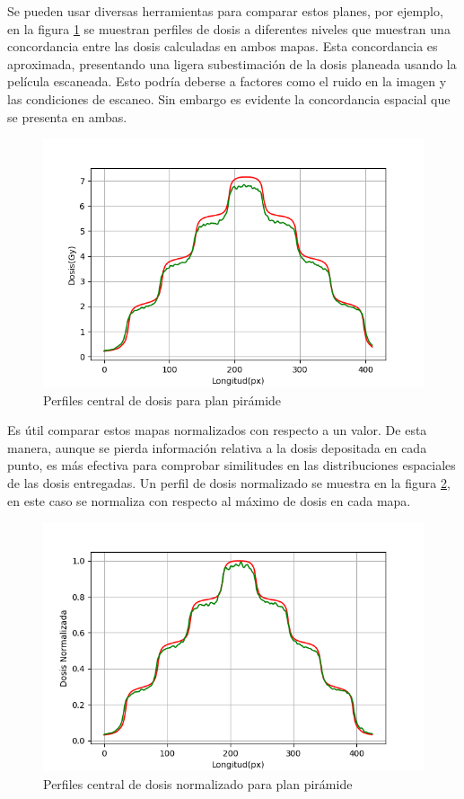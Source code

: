 Se pueden usar diversas herramientas para comparar estos planes, por ejemplo, en la figura \ref{fig:perfilesDosisPiramide} se muestran perfiles de dosis a diferentes niveles que muestran una concordancia entre las dosis calculadas en ambos mapas. Esta concordancia es aproximada, presentando una ligera subestimación de la dosis planeada usando la película escaneada. Esto podría deberse a factores como el ruido en la imagen y las condiciones de escaneo. Sin embargo es evidente la concordancia espacial que se presenta en ambas.\\
\begin{figure}[H]
	\centering
	\includegraphics[width=0.7\linewidth]{images/perfilCentralPiramide.png}
	
	\caption{Perfiles central de dosis para plan pirámide }
	\label{fig:perfilesDosisPiramide}
\end{figure}
Es útil comparar estos mapas normalizados con respecto a un valor. De esta manera, aunque se pierda información relativa a la dosis depositada en cada punto, es más efectiva para comprobar similitudes en las distribuciones espaciales de las dosis entregadas. Un perfil de dosis normalizado se muestra en la figura \ref{fig:perfilesDosisPiramideNorm}, en este caso se normaliza con respecto al máximo de dosis en cada mapa.\\
\begin{figure}[H]
	\centering
	\includegraphics[width=0.7\linewidth]{images/perfilPiramideNormalizado.png}
	
	\caption{Perfiles central de dosis normalizado para plan pirámide }
	\label{fig:perfilesDosisPiramideNorm}
\end{figure}

